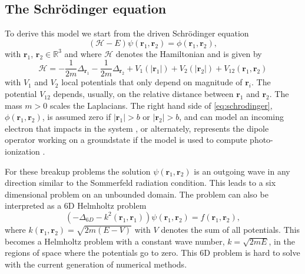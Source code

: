 \documentclass[mathpazo]{cicp}
\theoremstyle{definition}
\numberwithin{equation}{section}
\providecommand{\wv}{}
\providecommand{\hbz}{}
\begin{document}
\subsection{The Schr\"odinger equation}
To derive this model we start from the driven Schr\"odinger equation
\begin{equation}\label{eq:schrodinger}
 (\mathcal{H}-E)\psi(\mathbold{r}_1, \mathbold{r}_2) =  \phi(\mathbold{r}_1,\mathbold{r}_2),
\end{equation}
\wv{with $\mathbold{r}_1$, $\mathbold{r}_2 \in \mathbb{R}^3$} and where $\mathcal{H}$ denotes the Hamiltonian and is given by
\begin{equation}
  \mathcal{H} =  - \frac{1}{2m} \Delta_{\mathbold{r}_1}  - \frac{1}{2m} \Delta_{\mathbold{r}_2}  + V_1(|\mathbold{r}_1|) + V_2(|\mathbold{r}_2|) + V_{12}(\mathbold{r}_1,\mathbold{r}_2)
\end{equation}
with $V_1$ and $V_2$ local potentials that only depend on magnitude of
$\mathbold{r}_i$. The potential $V_{12}$ depends, \wv{usually,} on the relative
distance between $\mathbold{r}_1$ and $\mathbold{r}_2$. \wv{The mass $m>0$ scales the Laplacians.} The right hand
side of \eqref{eq:schrodinger}, \wv{$\phi(\mathbf{r}_1,\mathbf{r}_2)$,
 is assumed zero if $|\mathbf{r}_1| >b$ or $|\mathbf{r}_2| > b$,} and can
model an incoming electron that impacts in the system \cite{rescigno1999}, \hbz{or alternately, represents the dipole operator working on a groundstate if the model is used to compute photo-ionization \cite{Wim05}}. 

For these breakup problems the solution
$\psi(\mathbold{r}_1,\mathbold{r}_2)$ is  an outgoing wave in any
direction similar to the Sommerfeld radiation condition.  This leads to a six dimensional problem on an unbounded
domain.  The problem can also be interpreted as a 6D Helmholtz problem
\begin{equation}
  \left(-\Delta_{6D} - k^2(\mathbold{r}_1,\mathbold{r}_1)\right)\psi(\mathbf{r}_1,\mathbf{r}_2) = f(\mathbold{r}_1,\mathbold{r}_2),
\end{equation}
where $k(\mathbold{r}_1,\mathbold{r}_2) = \sqrt{2m(E-V)}$ with $V$
denotes the sum of all potentials.  This becomes a Helmholtz problem
with a constant wave number, $k=\sqrt{2mE}$, in the regions of space
where the potentials go to zero. This  6D problem is hard to solve with the current generation of numerical methods.
\end{document}
